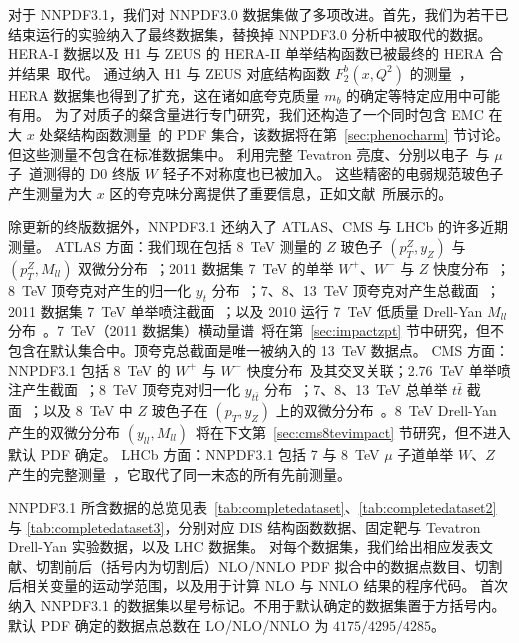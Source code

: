 对于 NNPDF3.1，我们对 NNPDF3.0 数据集做了多项改进。首先，我们为若干已结束运行的实验纳入了最终数据集，替换掉 NNPDF3.0 分析中被取代的数据。
%
HERA-I 数据以及 H1 与 ZEUS 的 HERA-II 单举结构函数已被最终的 HERA 合并结果~\cite{Abramowicz:2015mha}取代。
%
%
通过纳入 H1 与 ZEUS 对底结构函数 $F_2^b(x,Q^2)$ 的测量~\cite{Aaron:2009af,Abramowicz:2014zub}，HERA 数据集也得到了扩充，这在诸如底夸克质量 $m_b$ 的确定等特定应用中可能有用。
%
为了对质子的粲含量进行专门研究，我们还构造了一个同时包含 EMC 在大 $x$ 处粲结构函数测量~\cite{Aubert:1982tt}的 PDF 集合，该数据将在第~\ref{sec:phenocharm} 节讨论。但这些测量不包含在标准数据集中。
%
利用完整 Tevatron 亮度、分别以电子~\cite{D0:2014kma}与 $\mu$ 子~\cite{Abazov:2013rja}道测得的 D0 终版 $W$ 轻子不对称度也已被加入。
%
这些精密的电弱规范玻色子产生测量为大 $x$ 区的夸克味分离提供了重要信息，正如文献~\cite{Camarda:2015zba}所展示的。

除更新的终版数据外，NNPDF3.1 还纳入了 ATLAS、CMS 与 LHCb 的许多近期测量。
%
ATLAS 方面：我们现在包括 8~TeV 测量的 $Z$ 玻色子 $(p_T^Z,y_Z)$ 与 $(p_T^Z,M_{ll})$ 双微分分布~\cite{Aad:2015auj}；2011 数据集 7~TeV 的单举 $W^+$、$W^-$ 与 $Z$ 快度分布~\cite{Aaboud:2016btc}；8~TeV 顶夸克对产生的归一化 $y_t$ 分布~\cite{Aad:2015mbv}；7、8、13~TeV 顶夸克对产生总截面~\cite{Aad:2014kva,Aaboud:2016pbd}；2011 数据集 7~TeV 单举喷注截面~\cite{Aad:2014vwa}；以及 2010 运行 7~TeV 低质量 Drell-Yan $M_{ll}$ 分布~\cite{Aad:2014qja}。7~TeV（2011 数据集）横动量谱~\cite{Aad:2014xaa}将在第~\ref{sec:impactzpt} 节中研究，但不包含在默认集合中。顶夸克总截面是唯一被纳入的 13~TeV 数据点。
CMS 方面：NNPDF3.1 包括 8~TeV 的 $W^+$ 与 $W^-$ 快度分布~\cite{Khachatryan:2016pev}及其交叉关联；2.76~TeV 单举喷注产生截面~\cite{Khachatryan:2015luy}；8~TeV 顶夸克对归一化 $y_{t\bar{t}}$ 分布~\cite{Khachatryan:2015oqa}；7、8、13~TeV 总单举 $t\bar{t}$ 截面~\cite{Khachatryan:2016mqs}；以及 8~TeV 中 $Z$ 玻色子在 $(p_T,y_Z)$ 上的双微分分布~\cite{Khachatryan:2015oaa}。8~TeV Drell-Yan 产生的双微分分布 $(y_{ll},M_{ll})$~\cite{CMS:2014jea}将在下文第~\ref{sec:cms8tevimpact} 节研究，但不进入默认 PDF 确定。
LHCb 方面：NNPDF3.1 包括 7 与 8~TeV $\mu$ 子道单举 $W$、$Z$ 产生的完整测量~\cite{Aaij:2015gna,Aaij:2015zlq}，它取代了同一末态的所有先前测量。

NNPDF3.1 所含数据的总览见表~\ref{tab:completedataset}、\ref{tab:completedataset2} 与 \ref{tab:completedataset3}，分别对应 DIS 结构函数数据、固定靶与 Tevatron Drell-Yan 实验数据，以及 LHC 数据集。
%
对每个数据集，我们给出相应发表文献、切割前后（括号内为切割后）NLO/NNLO PDF 拟合中的数据点数目、切割后相关变量的运动学范围，以及用于计算 NLO 与 NNLO 结果的程序代码。
%
首次纳入 NNPDF3.1 的数据集以星号标记。不用于默认确定的数据集置于方括号内。默认
PDF 确定的数据点总数在 LO/NLO/NNLO 为 $4175/4295/4285$。

